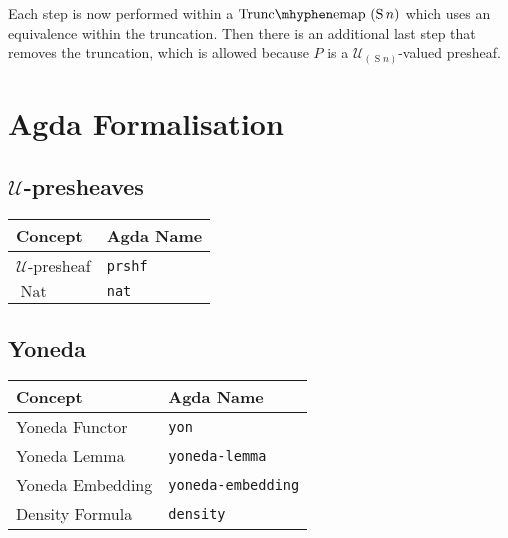 \documentclass[12pt, parskip, DIV=14]{scrbook}
\newcommand{\Nat}{\operatorname{Nat}}
\newcommand{\Suc}{\operatorname{S}}
\begin{document}
Each step is now performed within a $\mathrm{Trunc\mhyphen emap}~(\Suc n)$ which uses an equivalence within the truncation. Then there is an additional last step that removes the truncation, which is allowed because $P$ is a $\mathcal{U}_{(\Suc n)}$-valued presheaf.

%

\section{Agda Formalisation}

\subsection{$\mathcal{U}$-presheaves}

\begin{center}
\begin{tabular}{ll}
  Concept & Agda Name \\
  \hline
  $\mathcal{U}$-presheaf & \texttt{prshf} \\
  $\Nat$ & \texttt{nat} \\
\end{tabular}
\end{center}

\subsection{Yoneda}

\begin{center}
\begin{tabular}{ll}
  Concept & Agda Name \\
  \hline
  Yoneda Functor & \texttt{yon} \\
  Yoneda Lemma & \texttt{yoneda-lemma} \\
  Yoneda Embedding & \texttt{yoneda-embedding} \\
  Density Formula & \texttt{density} \\
\end{tabular}
\end{center}
\end{document}
